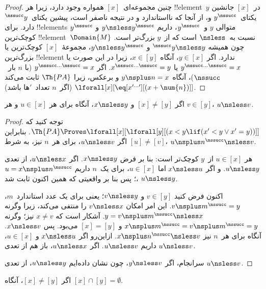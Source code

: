 \documentclass[../../../include/open-logic-section]{subfiles}
\begin{document}
\begin{proof}
چنین مجموعه‌ای~$[x]$ همواره وجود دارد، زیرا هر !!{element}~$y$
در~$[x]$ جانشین یکتای~$y^\nssucc$ و، از آنجا که نااستاندارد و در
نتیجه ناصفر است، پیشین یکتای~$^\nssucc y$ دارد. برای !!{element}s
متوالی $y$ و~$y^\nssucc$، داریم $y \nsless y^\nssucc$ و
$y^\nssucc$ کوچک‌ترین !!{element}~$\Domain{M}$ نسبت به~$\nsless$ است
که از~$y$ بزرگ‌تر است. چون همیشه
$^\nssucc y \nsless y$ و $y \nsless y^\nssucc$، مجموعهٔ~$[x]$
کوچک‌ترین یا بزرگ‌ترین !!{element} ندارد. اگر $y \in [x]$، آنگاه
$x \in [y]$، زیرا در این صورت یا
$y^{\nssucc\dots\nssucc} = x$ یا
$x^{\nssucc\dots\nssucc} = y$. اگر
$y^{\nssucc\dots\nssucc} = x$ (با $n$ بار~$\nssucc$)، آنگاه
$y \nsplus n = x$ و برعکس، زیرا $\Th{PA}$ ثابت می‌کند
$\lforall[x][\eq[x^{\prime\dots\prime}][(x + \num{n})]]$ (اگر~$n$
تعداد~$\prime$ها باشد).
\end{proof}

\begin{prop}
اگر $[x] \neq [y]$ و $x \nsless y$، آنگاه برای هر $u \in [x]$ و هر
$v \in [y]$، $u \nsless v$.
\end{prop}

\begin{proof}
توجه کنید که
$\Th{PA} \Proves \lforall[x][\lforall[y][(x < y \lif (x' < y
    \lor x' = y))]]$. بنابراین اگر $u \nsless v$، برای هر~$n$ نیز،
به شرط $[u] \neq [v]$، $u \nsplus n^\nssucc \nsless v$.

هر $u \in [x]$ از~$y$ کوچک‌تر است: بنا بر فرض $x \nsless y$. اگر
$u \nsless x$، از تعدی $u \nsless y$. و اگر $x \nsless u$ اما
$u \in [x]$، برای یک~$n$ داریم $u = x\nsplus n^\nssucc$؛ پس بنا بر
واقعیتی که همین اکنون ثابت شد، $u \nsless y$.

اکنون فرض کنید $v \in [y]$ و $v \nsless y$؛ یعنی برای یک عدد
استاندارد~$m$، $v \nsplus m^\nssucc = y$. این امر امکان
$v \nsless x$ را منتفی می‌کند، زیرا وگرنه
$y = v \nsplus m^\nssucc \nsless x$. آشکار است که $x \neq v$ نیز؛
وگرنه $x \nsplus m^\nssucc = v \nsplus m^\nssucc = y$ و
$[x] = [y]$ می‌بود. پس $x \nsless v$. آنگاه برای هر~$n$ نیز
$x \nsplus n^\nssucc \nsless v$. ازاین‌رو اگر $x \nsless u$ و
$u \in [x]$، داریم $u \nsless v$. اگر $u \nsless x$، باز هم از
تعدی $u \nsless v$.

سرانجام، اگر $y \nsless v$، چون نشان داده‌ایم $u \nsless y$، از
تعدی $u \nsless v$.
\end{proof}

\begin{cor}
اگر $[x] \neq [y]$، آنگاه $[x] \cap [y] = \emptyset$.
\end{cor}
\end{document}
